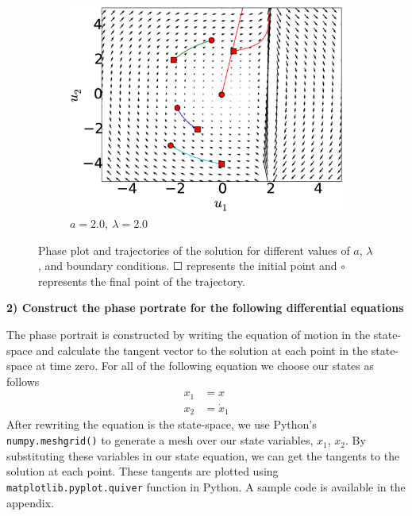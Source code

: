 \documentclass[14pt, a4paper]{extreport}
\begin{document}
\begin{figure}[H]
\begin{subfigure}[h]{8.0 cm}
        \includegraphics[width=8.0 cm]{figure/phase_a20_lambda20.eps}
		\caption{$a=2.0,\ \lambda = 2.0$}
    \end{subfigure}
    \caption{Phase plot and trajectories of the solution for different values of $a$, $\lambda$, and boundary conditions. $\Square$ represents the initial point and $\circ$ represents the final point of the trajectory.}
    \label{fig:phasePlot}
\end{figure}
%
\newpage
{\flushleft\large{\textbf{2) Construct the phase portrate for the following differential equations}}}

The phase portrait is constructed by writing the equation of motion in the state-space and calculate the tangent vector to the solution at each point in the state-space at time zero. For all of the following equation we choose our states as follows
%
\begin{equation*}
\begin{aligned}
	x_1 &= x \\
	x_2 &= \dot{x}_1
\end{aligned}
\end{equation*}
%
After rewriting the equation is the state-space, we use Python's \texttt{numpy.meshgrid()} to generate a mesh over our state variables, $x_1$, $x_2$. By substituting these variables in our state equation, we can get the tangents to the solution at each point. These tangents are plotted using \texttt{matplotlib.pyplot.quiver} function in Python. A sample code is available in the appendix.
\end{document}
